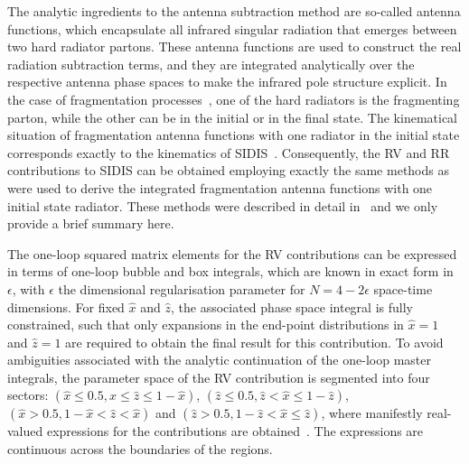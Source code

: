 \documentclass[10pt,aps,prl,twocolumn,preprintnumbers,nofootinbib]{revtex4-2}
\begin{document}
The analytic ingredients to the antenna subtraction method are so-called antenna
functions, which encapsulate all infrared singular radiation that emerges
between two hard radiator partons. These antenna functions are used to construct
the real radiation subtraction terms, and they are integrated analytically over
the respective antenna phase spaces to make the infrared pole structure
explicit.  In the case of fragmentation processes~\cite{Gehrmann:2022pzd}, one
of the hard radiators is the fragmenting parton, while the other can be in the
initial or in the final state. The kinematical situation of fragmentation
antenna functions with one radiator in the initial state corresponds exactly to
the kinematics of SIDIS~\cite{Gehrmann:2021lwb}. 
Consequently, the RV and RR contributions to SIDIS can
be obtained employing exactly the same methods as were used to derive the
integrated fragmentation antenna functions with one initial state
radiator. These methods were described in detail in~\cite{Gehrmann:2022cih} and
we only provide a brief summary here.

The one-loop squared matrix elements for the RV contributions can be expressed
in terms of one-loop bubble and box integrals, which are known in exact form in
$\epsilon$,
with $\epsilon$ the dimensional regularisation parameter
for $N = 4-2\epsilon$ space-time dimensions.
For fixed $\hat{x}$ and $\hat{z}$, the associated phase space
integral is fully constrained, such that only expansions in the end-point
distributions in $\hat{x}=1$ and $\hat{z}=1$ are required to obtain the final
result for this contribution. To avoid ambiguities associated with the analytic
continuation of the one-loop master integrals, the parameter space of the RV
contribution is segmented into four sectors: $(\hat{x}\leq 0.5, \hat{x}\leq
\hat{z}\leq 1-\hat{x})$, $(\hat{z}\leq 0.5, \hat{z}<\hat{x}\leq 1-\hat{z})$,
$(\hat{x}>0.5,1-\hat{x}< \hat{z}<\hat{x})$ and
$(\hat{z}>0.5,1-\hat{z}<\hat{x}\leq \hat{z})$, where manifestly real-valued
expressions for the contributions are obtained~\cite{Gehrmann:2022cih}. The
expressions are continuous across the boundaries of the regions.
\end{document}

